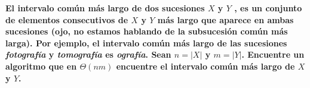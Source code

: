 \textbf{El intervalo común más largo de dos sucesiones $X$ y $Y$ , es un conjunto de elementos consecutivos de $X$ y $Y$ más largo que aparece en ambas sucesiones (ojo, no estamos hablando de la subsucesión común más larga). Por ejemplo, el intervalo común más largo de las sucesiones \textit{fotografía} y \textit{tomografía} es \textit{ografía}. Sean $n = |X|$ y $m = |Y|$. Encuentre un algoritmo que en $\Theta(nm)$ encuentre el intervalo común más largo de $X$ y $Y$.}\vspace{.2cm}

\textcolor{bibi}{}
\begin{quote}
\end{quote}